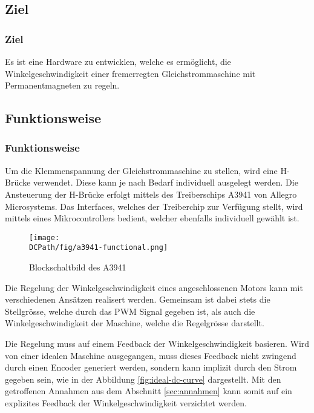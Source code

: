 \ifSTANDALONE
\subsection{Ziel}
\fi
\ifEMBED
\subsubsection{Ziel}
\fi
Es ist eine Hardware zu entwicklen, welche es ermöglicht, die
Winkelgeschwindigkeit einer fremerregten Gleichstrommaschine mit
Permanentmagneten zu regeln.

\ifSTANDALONE
\subsection{Funktionsweise}
\fi
\ifEMBED
\subsubsection{Funktionsweise}
\fi
Um die Klemmenspannung der Gleichstrommaschine zu stellen, wird eine
H-Brücke verwendet. Diese kann je nach Bedarf individuell ausgelegt
werden. Die Ansteuerung der H-Brücke erfolgt mittels des Treiberschips
A3941 von Allegro Microsystems. Das Interfaces, welches der
Treiberchip zur Verfügung stellt, wird mittels eines Mikrocontrollers
bedient, welcher ebenfalls individuell gewählt ist.

\begin{figure}[h!]
    \centering
    \texttt{[image: \\DCPath/fig/a3941-functional.png]}
    \caption[Blockschaltbild des A3941]{Blockschaltbild des A3941 \cite{Datasheet:A3941}}
    \label{fig:a3941-functional}
\end{figure}

Die Regelung der Winkelgeschwindigkeit eines angeschlossenen Motors kann
mit verschiedenen Ansätzen realisert werden. Gemeinsam ist dabei stets die
Stellgrösse, welche durch das PWM Signal gegeben ist, als auch die
Winkelgeschwindigkeit der Maschine, welche die Regelgrösse darstellt.

Die Regelung muss auf einem Feedback der Winkelgeschwindigkeit basieren.
Wird von einer idealen Maschine ausgegangen, muss dieses Feedback nicht
zwingend durch einen Encoder generiert werden, sondern kann implizit durch
den Strom gegeben sein, wie in der Abbildung \ref{fig:ideal-dc-curve}
dargestellt. Mit den getroffenen Annahmen aus dem Abschnitt
\ref{sec:annahmen} kann somit auf ein explizites Feedback der
Winkelgeschwindigkeit verzichtet werden. 

